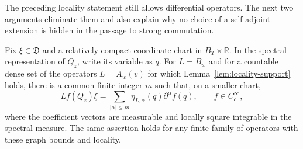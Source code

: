 The preceding locality statement still allows differential
operators.  The next two arguments eliminate them and also explain
why no choice of a self-adjoint extension is hidden in the passage
to strong commutation.

\begin{lemma}
\label{lem:locality-jets}
Fix $\xi\in\mathfrak D$ and a relatively compact coordinate chart
in $B_T\times\mathbb R$.  In the spectral representation of $Q_z$,
write its variable as $q$.  For $L=B_w$ and for a countable dense
set of the operators $L=A_w(v)$ for which
Lemma~\ref{lem:locality-support} holds, there is a common finite
integer $m$ such that, on a smaller chart,
\begin{equation}
 Lf(Q_z)\xi
 =\sum_{|\alpha|\le m}\eta_{L,\alpha}(q)
                          \partial^\alpha f(q),
 \qquad f\in C_c^\infty,
 \label{eq:locality-jet-expansion}
\end{equation}
where the coefficient vectors are measurable and locally square
integrable in the spectral measure.  The same assertion holds for
any finite family of operators with these graph bounds and locality.
\end{lemma}

